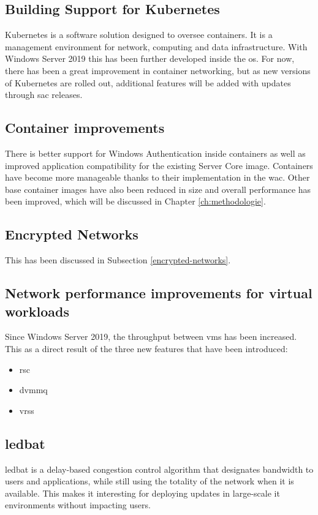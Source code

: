 \subsection*{Building Support for Kubernetes}
Kubernetes is a software solution designed to oversee containers. 
It is a management environment for network, computing and data infrastructure. 
With Windows Server 2019 this has been further developed inside the \acrshort{os}. 
For now, there has been a great improvement in container networking, but as new versions of Kubernetes are rolled out, additional features will be added with updates through \acrfull{sac} releases.
\subsection*{Container improvements}
There is better support for Windows Authentication inside containers as well as improved application compatibility for the existing Server Core image. 
Containers have become more manageable thanks to their implementation in the \acrlong{wac}.
Other base container images have also been reduced in size and overall performance has been improved, which will be discussed in Chapter \ref{ch:methodologie}. 
\subsection*{Encrypted Networks}
This has been discussed in Subsection \ref{encrypted-networks}.
\subsection*{Network performance improvements for virtual workloads}
Since Windows Server 2019, the throughput between \acrshort{vm}s has been increased. 
This as a direct result of the three new features that have been introduced:
\begin{itemize}
	\item \acrfull{rsc}
	\item \acrfull{dvmmq}
	\item \acrfull{vrss}
\end{itemize}
\subsection*{\acrfull{ledbat}}
\acrshort{ledbat} is a delay-based congestion control algorithm that designates bandwidth to users and applications, while still using the totality of the network when it is available. \autocite{Shalunov2012}
This makes it interesting for deploying updates in large-scale \acrshort{it} environments without impacting users.
